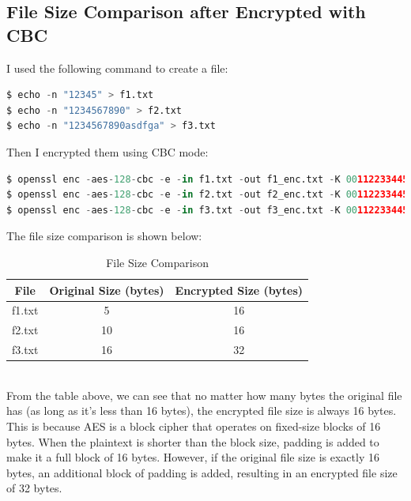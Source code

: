 \documentclass{article}
\begin{document}
\subsection{File Size Comparison after Encrypted with CBC}
I used the following command to create a file:
\begin{lstlisting}[language=Python]
$ echo -n "12345" > f1.txt
$ echo -n "1234567890" > f2.txt
$ echo -n "1234567890asdfga" > f3.txt
\end{lstlisting}
Then I encrypted them using CBC mode:
\begin{lstlisting}[language=Python]
$ openssl enc -aes-128-cbc -e -in f1.txt -out f1_enc.txt -K 00112233445566778889aabbccddeeff -iv 0102030405060708090a0b0c0d0e0f10
$ openssl enc -aes-128-cbc -e -in f2.txt -out f2_enc.txt -K 00112233445566778889aabbccddeeff -iv 0102030405060708090a0b0c0d0e0f10
$ openssl enc -aes-128-cbc -e -in f3.txt -out f3_enc.txt -K 00112233445566778889aabbccddeeff -iv 0102030405060708090a0b0c0d0e0f10
\end{lstlisting}
The file size comparison is shown below:
\begin{table}[h]
\centering
\begin{tabular}{|c|c|c|}
\hline
\textbf{File} & \textbf{Original Size (bytes)} & \textbf{Encrypted Size (bytes)} \\
\hline
f1.txt & 5 & 16 \\
\hline
f2.txt & 10 & 16 \\
\hline
f3.txt & 16 & 32 \\
\hline
\end{tabular}
\caption{File Size Comparison}
\end{table}\\
From the table above, we can see that no matter how many bytes the original file has (as long as it's less than 16 bytes),
the encrypted file size is always 16 bytes. This is because AES is a block cipher that operates on fixed-size blocks of 16 bytes.
When the plaintext is shorter than the block size, padding is added to make it a full block of 16 bytes. However, if the original
file size is exactly 16 bytes, an additional block of padding is added, resulting in an encrypted file size of 32 bytes.
\end{document}
